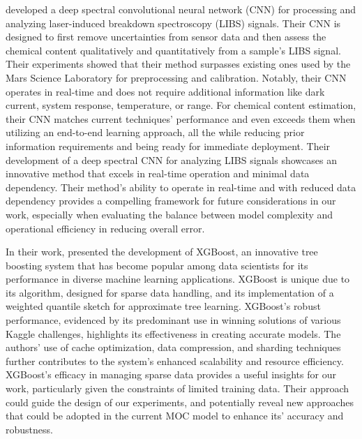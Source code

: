 \citeauthor{castorena_deep_2021} developed a deep spectral convolutional neural network (CNN) for processing and analyzing laser-induced breakdown spectroscopy (LIBS) signals.
Their CNN is designed to first remove uncertainties from sensor data and then assess the chemical content qualitatively and quantitatively from a sample's LIBS signal.
Their experiments showed that their method surpasses existing ones used by the Mars Science Laboratory for preprocessing and calibration.
Notably, their CNN operates in real-time and does not require additional information like dark current, system response, temperature, or range.
For chemical content estimation, their CNN matches current techniques' performance and even exceeds them when utilizing an end-to-end learning approach, all the while reducing prior information requirements and being ready for immediate deployment\cite{castorena_deep_2021}.
Their development of a deep spectral CNN for analyzing LIBS signals showcases an innovative method that excels in real-time operation and minimal data dependency. Their method's ability to operate in real-time and with reduced data dependency provides a compelling framework for future considerations in our work, especially when evaluating the balance between model complexity and operational efficiency in reducing overall error.

In their work, \citeauthor{chen_xgboost_2016} presented the development of XGBoost, an innovative tree boosting system that has become popular among data scientists for its performance in diverse machine learning applications. 
XGBoost is unique due to its algorithm, designed for sparse data handling, and its implementation of a weighted quantile sketch for approximate tree learning.
XGBoost's robust performance, evidenced by its predominant use in winning solutions of various Kaggle challenges, highlights its effectiveness in creating accurate models.
The authors' use of cache optimization, data compression, and sharding techniques further contributes to the system's enhanced scalability and resource efficiency\cite{chen_xgboost_2016}.
XGBoost's efficacy in managing sparse data provides a useful insights for our work, particularly given the constraints of limited training data. Their approach could guide the design of our experiments, and potentially reveal new approaches that could be adopted in the current MOC model to enhance its' accuracy and robustness.